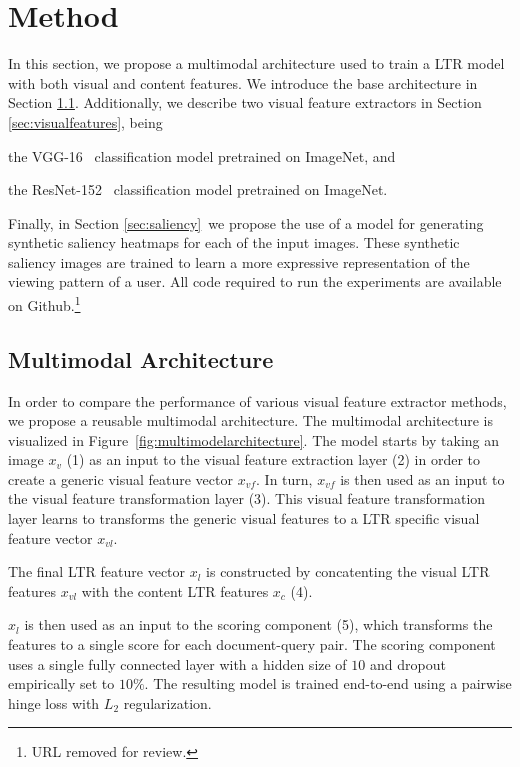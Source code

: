 
\section{Method}
In this section, we propose a multimodal architecture used to train a \ac{LTR} model with both visual and content features. We introduce the base architecture in Section \ref{sec:multimodal}. Additionally, we describe two visual feature extractors in Section  \ref{sec:visualfeatures}, being
\begin{inparaenum}[(i)]
\item the VGG-16~\cite{simonyan2014very} classification model pretrained on ImageNet, and
\item the ResNet-152~\cite{he2016deep} classification model pretrained on ImageNet.
\end{inparaenum} 
Finally, in Section \ref{sec:saliency}~we propose the use of a model for generating synthetic saliency heatmaps for each of the input images. These synthetic saliency images are trained to learn a more expressive representation of the viewing pattern of a user. 
All code required to run the experiments are available on Github.\footnote{URL removed for review.}

\subsection{Multimodal Architecture} \label{sec:multimodal}
In order to compare the performance of various visual feature extractor methods, we propose a reusable multimodal architecture. 
The multimodal architecture is visualized in Figure~\ref{fig:multimodelarchitecture}. 
The model starts by taking an image $x_{v}$ (1) as an input to the visual feature extraction layer (2) in order to create a generic visual feature vector $x_{vf}$. In turn, $x_{vf}$ is then used as an input to the visual feature transformation layer (3).
This visual feature transformation layer learns to transforms the generic visual features to a \ac{LTR} specific visual feature vector $x_{vl}$.

The final \ac{LTR} feature vector $x_{l}$ is constructed by concatenting the visual \ac{LTR} features $x_{vl}$ with the content \ac{LTR} features $x_{c}$ (4). 

$x_{l}$ is then used as an input to the scoring component (5), which transforms the features to a single score for each document-query pair. The scoring component uses a single fully connected layer with a hidden size of $10$ and dropout empirically set to $10\%$. The resulting model is trained end-to-end using a pairwise hinge loss with $L_2$ regularization. 

